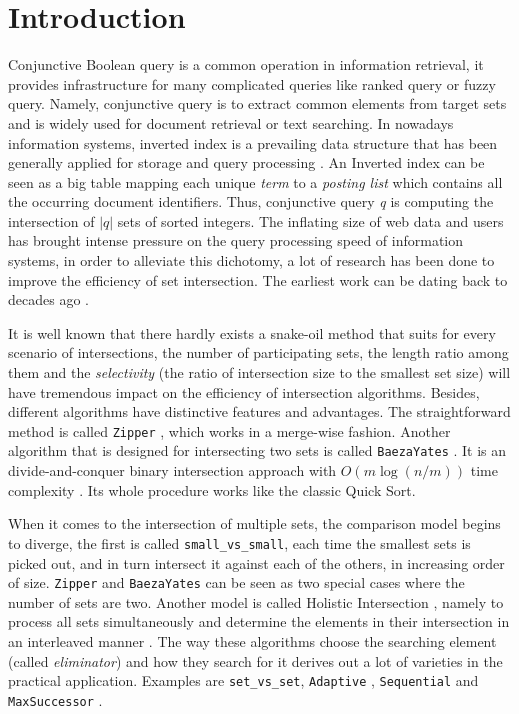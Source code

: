 \documentclass[runningheads,a4paper]{llncs}
\begin{document}
\section{Introduction}\label{sec:introduction}
Conjunctive Boolean query is a common operation in information retrieval, it provides infrastructure for many complicated queries like ranked query or fuzzy query.
Namely, conjunctive query is to extract common elements from target sets and is widely used for document retrieval or text searching.
In nowadays information systems, inverted index is a prevailing data structure that has been generally applied for storage and query processing \cite{culpepper2010efficient,zobel2006inverted}.
An Inverted index can be seen as a big table mapping each unique \textit{term} to a \textit{posting list} which contains all the occurring document identifiers.
Thus, conjunctive query \textit{q} is computing the intersection of $ |q| $ sets of sorted integers.
The inflating size of web data and users has brought intense pressure on the query processing speed of information systems, in order to alleviate this dichotomy, a lot of research has been done to improve the efficiency of set intersection.
The earliest work can be dating back to decades ago \cite{Hwang1971Optimal,Hwang1972A}.

It is well known that there hardly exists a snake-oil method that suits for every scenario of intersections, the number of participating sets, the length ratio among them and the \textit{selectivity} (the ratio of intersection size to the smallest set size) will have tremendous impact on the efficiency of intersection algorithms.
Besides, different algorithms have distinctive features and advantages.
The straightforward method is called \texttt{Zipper} \cite{Sanders2007Intersection}, which works in a merge-wise fashion.
Another algorithm that is designed for intersecting two sets is called \texttt{BaezaYates} \cite{Baeza2010Fast,Baezayates2004A,Baezayates2005Experimental}.
It is an divide-and-conquer binary intersection approach with $ O(m\log (n/m)) $ time complexity \cite{culpepper2010efficient}.
Its whole procedure works like the classic Quick Sort.

When it comes to the intersection of multiple sets, the comparison model begins to diverge, the first is called \texttt{small\_vs\_small}, each time the smallest sets is picked out, and in turn intersect it against each of the others, in increasing order of size.
\texttt{Zipper} and \texttt{BaezaYates} can be seen as two special cases where the number of sets are two.
Another model is called Holistic Intersection \cite{culpepper2010efficient}, namely to process all sets simultaneously and determine the elements in their intersection in an interleaved manner \cite{Culpepper2007Compact}.
The way these algorithms choose the searching element (called \textit{eliminator}) and how they search for it derives out a lot of varieties in the practical application.
Examples are \texttt{set\_vs\_set}, \texttt{Adaptive} \cite{Barbay2006Faster,Demaine2000Adaptive,Demaine2001Experiments}, \texttt{Sequential} \cite{Barbay2002Adaptive,Barbay2003Optimality} and \texttt{MaxSuccessor} \cite{Culpepper2007Compact}.
\end{document}
